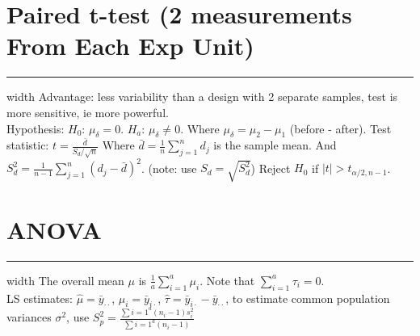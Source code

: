 \documentclass[10pt]{article}
\begin{document}
\section*{Paired t-test (2 measurements From Each Exp Unit)}
\hrule width \textwidth
\vspace{6pt}
Advantage: less variability than a design with 2 separate samples, test is more sensitive, ie more powerful. \\
Hypothesis: $H_0$: $\mu_{\delta} = 0$. $H_a$: $\mu_{\delta} \neq 0$. Where $\mu_{\delta} = \mu_2 - \mu_1$ (before - after).
Test statistic: $t = \frac{\bar{d}}{S_d / \sqrt{n}}$ Where $\bar{d} = \frac{1}{n}\sum_{j=1}^{n}d_j$ is the sample mean.
And $S_d^2 = \frac{1}{n-1} \sum_{j=1}^{n}(d_j - \bar{d})^2$. (note: use $S_d = \sqrt{S_d^2}$) Reject $H_0$ if $\left| t \right| > t_{\alpha/2, n-1}$.

\section*{ANOVA}
\hrule width \textwidth
\vspace{6pt}
The overall mean $\mu$ is $\frac{1}{a} \sum_{i=1}^{a} \mu_i$. Note that $\sum_{i=1}^{a}\tau_i = 0$. \\
LS estimates: $\hat{\mu} = \bar{y}_{\cdot \cdot}$, $\hat{\mu}_i = \bar{y}_{i \cdot}$, $\hat{\tau} = \bar{y}_{i \cdot} - \bar{y}_{\cdot \cdot}$, to estimate common population variances $\sigma^2$, use $S_p^2 = \frac{\sum{i=1}^{a}(n_i - 1)s_i^2}{\sum{i=1}^{a}(n_i -1)}$
\end{document}
